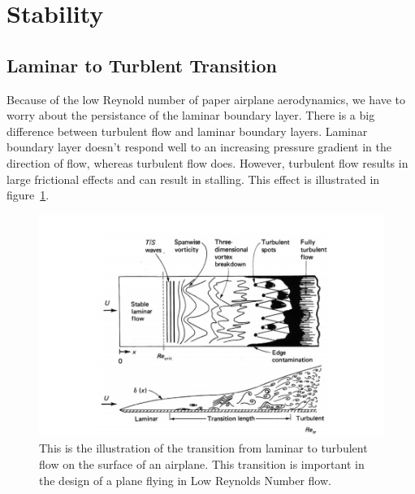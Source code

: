 
\section{Stability}

\subsection{Laminar to Turblent Transition}

Because of the low Reynold number of paper airplane aerodynamics, we have to worry about
the persistance of the laminar boundary layer.
There is a big difference between turbulent flow and laminar boundary
layers. Laminar boundary layer doesn't respond well to an increasing
pressure gradient in the direction of flow, whereas turbulent flow does.
However, turbulent flow results in large frictional effects and can result in stalling.
This effect is illustrated in figure~\ref{fig:boundary_layer_transition}.

\begin{figure}[hl]
  \centering
    \includegraphics[scale=.5]{figures/boundary_layer_transition.png}
    \caption{This is the illustration of the transition from laminar to turbulent flow on the
    surface of an airplane. This transition is important in the design of a plane flying in
    Low Reynolds Number flow.}
  \label{fig:boundary_layer_transition}
\end{figure}

